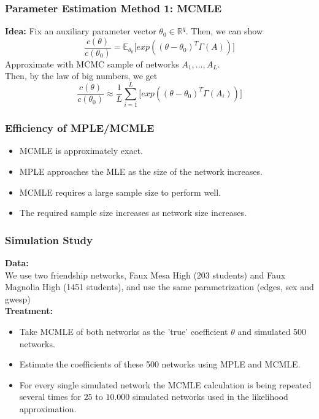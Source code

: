 \documentclass[xcolor=dvipsnames]{beamer}
\begin{document}
\begin{frame}
\frametitle{Parameter Estimation Method 1: MCMLE}
\textbf{Idea:} Fix an auxiliary parameter vector $\theta_0 \in \mathbb{R}^q$. Then, we can show 
$$\frac{c(\theta)}{c(\theta_0)}= \mathbb{E}_{\theta_0}\bigl[exp((\theta-\theta_0)^T\Gamma(A))\bigr]$$
Approximate with MCMC sample of networks $A_1, \dots , A_L$.\\[0.4cm]
Then, by the law of big numbers, we get
$$\frac{c(\theta)}{c(\theta_0)}\approx \frac{1}{L}\sum_{i=1}^L\bigl[exp((\theta-\theta_0)^T\Gamma(A_i))\bigr]$$
\end{frame}




\begin{frame}
\frametitle{Efficiency of MPLE/MCMLE}
\begin{itemize}
\item MCMLE is approximately exact.\\[0.8cm]
\item MPLE approaches the MLE as the size of the network increases.\\[0.8cm]
\item MCMLE requires a large sample size to perform well.\\[0.8cm]
\item The required sample size increases as network size increases.
\end{itemize}
\end{frame}

\begin{frame}
\frametitle{Simulation Study}
\textbf{Data:}\\ 
We use two friendship networks, Faux Mesa High (203 students) and Faux Magnolia High (1451 students), and use the same parametrization (edges, sex and gwesp)\\[0.2cm]
\textbf{Treatment:} \\
\begin{itemize}
\item Take MCMLE of both networks as the 'true' coefficient $\theta$ and simulated 500 networks.\\[0.2cm]
\item Estimate the coefficients of these 500 networks using MPLE and MCMLE.\\[0.2cm]
\item For every single simulated
network the MCMLE calculation is being repeated several times for $25$ to
$10.000$ simulated networks used in the likelihood approximation.
\end{itemize}
\end{frame}
\end{document}
